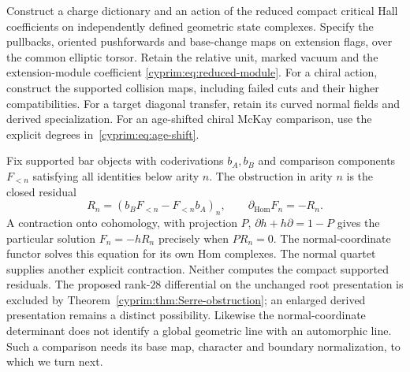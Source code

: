 \begin{problem}\label{cyprim:prob:compact-action}
Construct a charge dictionary and an action
of the reduced compact critical Hall
coefficients on independently defined
geometric state complexes. Specify the
pullbacks, oriented pushforwards and
base-change maps on extension flags, over
the common elliptic torsor. Retain the
relative unit, marked vacuum and the
extension-module coefficient
\eqref{cyprim:eq:reduced-module}.
For a chiral action, construct the supported
collision maps, including failed cuts and
their higher compatibilities. For a target
diagonal transfer, retain its curved normal
fields and derived specialization. For an
age-shifted chiral McKay comparison, use
the explicit degrees in~\eqref{cyprim:eq:age-shift}.
\end{problem}

Fix supported bar objects with coderivations
$b_A,b_B$ and comparison components $F_{<n}$
satisfying all identities below arity $n$.
The obstruction in arity $n$ is the closed
residual
\[
 R_n=(b_BF_{<n}-F_{<n}b_A)_n,\qquad
 \partial_{\mathrm{Hom}}F_n=-R_n.
\]
A contraction onto cohomology, with projection $P$,
$\partial h+h\partial=1-P$ gives the
particular solution $F_n=-hR_n$ precisely
when $PR_n=0$. The normal-coordinate functor
solves this equation for its own Hom
complexes. The normal quartet supplies
another explicit contraction. Neither
computes the compact supported residuals.
The proposed rank-$28$ differential on the unchanged
root presentation is excluded by
Theorem~\ref{cyprim:thm:Serre-obstruction};
an enlarged derived presentation remains
a distinct possibility. Likewise the
normal-coordinate determinant does not
identify a global geometric line with an
automorphic line. Such a comparison needs
its base map, character and boundary
normalization, to which we turn next.
